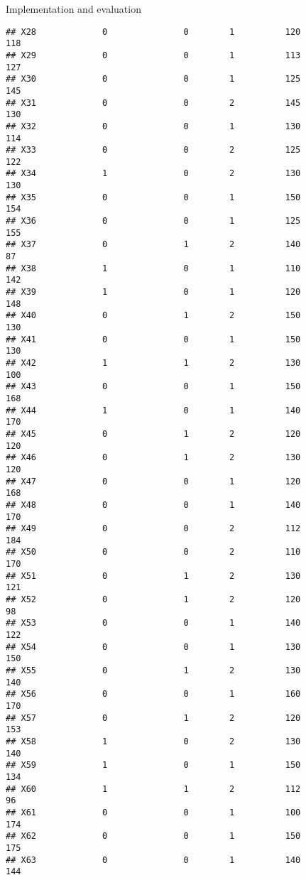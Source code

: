 \documentclass[
  ignorenonframetext,
]{beamer}
\begin{document}
\begin{frame}[fragile]{Implementation and evaluation}
\begin{verbatim}
## X28             0               0        1          120            118
## X29             0               0        1          113            127
## X30             0               0        1          125            145
## X31             0               0        2          145            130
## X32             0               0        1          130            114
## X33             0               0        2          125            122
## X34             1               0        2          130            130
## X35             0               0        1          150            154
## X36             0               0        1          125            155
## X37             0               1        2          140             87
## X38             1               0        1          110            142
## X39             1               0        1          120            148
## X40             0               1        2          150            130
## X41             0               0        1          150            130
## X42             1               1        2          130            100
## X43             0               0        1          150            168
## X44             1               0        1          140            170
## X45             0               1        2          120            120
## X46             0               1        2          130            120
## X47             0               0        1          120            168
## X48             0               0        1          140            170
## X49             0               0        2          112            184
## X50             0               0        2          110            170
## X51             0               1        2          130            121
## X52             0               1        2          120             98
## X53             0               0        1          140            122
## X54             0               0        1          130            150
## X55             0               1        2          130            140
## X56             0               0        1          160            170
## X57             0               1        2          120            153
## X58             1               0        2          130            140
## X59             1               0        1          150            134
## X60             1               1        2          112             96
## X61             0               0        1          100            174
## X62             0               0        1          150            175
## X63             0               0        1          140            144

\end{verbatim}
\end{frame}
\end{document}
